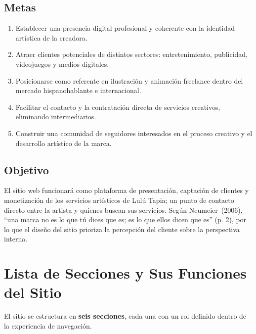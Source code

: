 \documentclass[12pt, letterpaper]{article}
\begin{document}
\subsection{Metas}

\begin{enumerate}
  \item Establecer una presencia digital profesional y coherente con la identidad artística de la creadora.
  \item Atraer clientes potenciales de distintos sectores: entretenimiento, publicidad, videojuegos y medios digitales.
  \item Posicionarse como referente en ilustración y animación freelance dentro del mercado hispanohablante e internacional.
  \item Facilitar el contacto y la contratación directa de servicios creativos, eliminando intermediarios.
  \item Construir una comunidad de seguidores interesados en el proceso creativo y el desarrollo artístico de la marca.
\end{enumerate}

\subsection{Objetivo}

El sitio web funcionará como plataforma de presentación, captación de clientes y monetización de los servicios artísticos de Lulú Tapia; un punto de contacto directo entre la artista y quienes buscan sus servicios. Según Neumeier~(2006), ``una marca no es lo que tú dices que es; es lo que ellos dicen que es'' (p. 2), por lo que el diseño del sitio prioriza la percepción del cliente sobre la perspectiva interna.


\section{Lista de Secciones y Sus Funciones del Sitio}

\begin{tcolorbox}[
  colback=luluLightGray, colframe=luluMidGray!40,
  arc=4pt, boxrule=0.6pt,
  left=8pt, right=8pt, top=6pt, bottom=6pt
]
El sitio se estructura en \textbf{seis secciones}, cada una con un rol definido dentro de la experiencia de navegación.
\end{tcolorbox}
\end{document}
